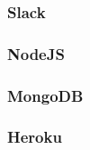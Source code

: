 
\subsubsection{Slack}
\label{sec:slack}


\subsubsection{NodeJS}
\label{sec:nodejs}


\subsubsection{MongoDB}
\label{sec:mongo}


\subsubsection{Heroku}
\label{sec:heroku}


